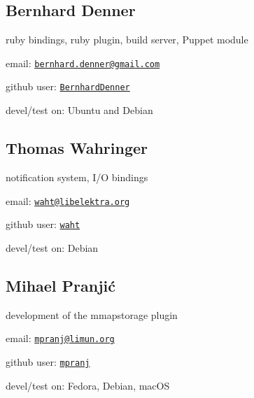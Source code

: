 \subsection*{Bernhard Denner}

ruby bindings, ruby plugin, build server, Puppet module


\begin{DoxyItemize}
\item email\+: \href{mailto:bernhard.denner@gmail.com}{\tt bernhard.\+denner@gmail.\+com}
\item github user\+: \href{https://github.com/BernhardDenner}{\tt Bernhard\+Denner}
\item devel/test on\+: Ubuntu and Debian
\end{DoxyItemize}

\subsection*{Thomas Wahringer}

notification system, I/O bindings


\begin{DoxyItemize}
\item email\+: \href{mailto:waht@libelektra.org}{\tt waht@libelektra.\+org}
\item github user\+: \href{https://github.com/waht}{\tt waht}
\item devel/test on\+: Debian
\end{DoxyItemize}

\subsection*{Mihael Pranjić}

development of the mmapstorage plugin


\begin{DoxyItemize}
\item email\+: \href{mailto:mpranj@limun.org}{\tt mpranj@limun.\+org}
\item github user\+: \href{https://github.com/mpranj}{\tt mpranj}
\item devel/test on\+: Fedora, Debian, mac\+OS 
\end{DoxyItemize}